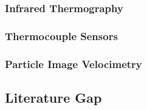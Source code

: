 \subsubsection{Infrared Thermography}
\subsubsection{Thermocouple Sensors}
\subsubsection{Particle Image Velocimetry}

\pagebreak
\subsection{Literature Gap}

\pagebreak






